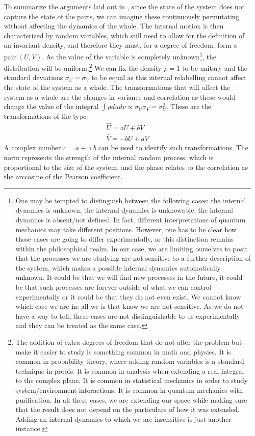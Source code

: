 \documentclass{ws-ijqi}
\begin{document}
To summarize the arguments laid out in \cite{Carc1}, since the state of the system does not capture the state of the parts, we can imagine these continuously permutating without affecting the dynamics of the whole. The internal motion is then characterized by random variables, which still need to allow for the definition of an invariant density, and therefore they must, for a degree of freedom, form a pair $(U,V)$. As the value of the variable is completely unknown\footnote{One may be tempted to distinguish between the following cases: the internal dynamics is unknown, the internal dynamics is unknowable, the internal dynamics is absent/not defined. In fact, different interpretations of quantum mechanics may take different positions. However, one has to be clear how those cases are going to differ experimentally, or this distinction remains within the philosophical realm. In our case, we are limiting ourselves to posit that the processes we are studying are not sensitive to a further description of the system, which makes a possible internal dynamics automatically unknown. It could be that we will find new processes in the future, it could be that such processes are forever outside of what we can control experimentally or it could be that they do not even exist. We cannot know which case we are in: all we is that know we are not sensitive. As we do not have a way to tell, these cases are not distinguishable to us experimentally and they can be treated as the same case.}, the distribution will be uniform.\footnote{The addition of extra degrees of freedom that do not alter the problem but make it easier to study is something common in math and physics. It is common in probability theory, where adding random variables is a standard technique in proofs. It is common in analysis when extending a real integral to the complex plane. It is common in statistical mechanics in order to study system/environment interactions. It is common in quantum mechanics with purification. In all these cases, we are extending our space while making sure that the result does not depend on the particulars of how it was extended. Adding an internal dynamics to which we are insensitive is just another instance.} We can fix the density $\rho=1$ to be unitary and the standard deviations $\sigma_U=\sigma_V$ to be equal as this internal relabelling cannot affect the state of the system as a whole. The transformations that will affect the system as a whole are the changes in variance and correlation as these would change the value of the integral $\int \rho dudv \propto \sigma_U\sigma_V = \sigma_U^2$. These are the transformations of the type:
\begin{equation}
	\begin{aligned}
	\hat{U} = a U + b V \\
	\hat{V} = -b U + a V
	\end{aligned}
\end{equation}
A complex number $c=a + \imath b$ can be used to identify such transformations. The norm represents the strength of the internal random process, which is proportional to the size of the system, and the phase relates to the correlation as the arccosine of the Pearson coefficient.
\end{document}
